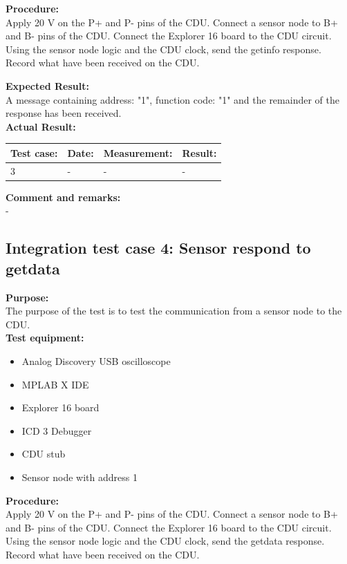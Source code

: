 \textbf{Procedure:}\\
Apply 20 V on the P+ and P- pins of the CDU. Connect a sensor node to B+ and B- pins of the CDU. Connect the Explorer 16 board to the CDU circuit. Using the sensor node logic and the CDU clock, send the getinfo response. Record what have been received on the CDU.

\textbf{Expected Result:}\\
A message containing address: "1", function code: "1" and the remainder of the response has been received.\\

\textbf{Actual Result:}\\
\begin{table}[H]
\centering
\begin{tabular}{|p{2cm}|p{2cm}|p{3cm}|p{2cm}|}\hline
\textbf{Test case:} & \textbf{Date:} & \textbf{Measurement:} & \textbf{Result:} \\ \hline
3 & - & - & - \\ \hline
\end{tabular}
\end{table}


\textbf{Comment and remarks:}\\
-\\

\subsection{Integration test case 4: Sensor respond to getdata}
\textbf{Purpose:}\\
The purpose of the test is to test the communication from a sensor node to the CDU.\\

\textbf{Test equipment:}
\begin{itemize}
\item Analog Discovery USB oscilloscope
\item MPLAB X IDE
\item Explorer 16 board
\item ICD 3 Debugger
\item CDU stub
\item Sensor node with address 1
\end{itemize}

\textbf{Procedure:}\\
Apply 20 V on the P+ and P- pins of the CDU. Connect a sensor node to B+ and B- pins of the CDU. Connect the Explorer 16 board to the CDU circuit. Using the sensor node logic and the CDU clock, send the getdata response. Record what have been received on the CDU.

